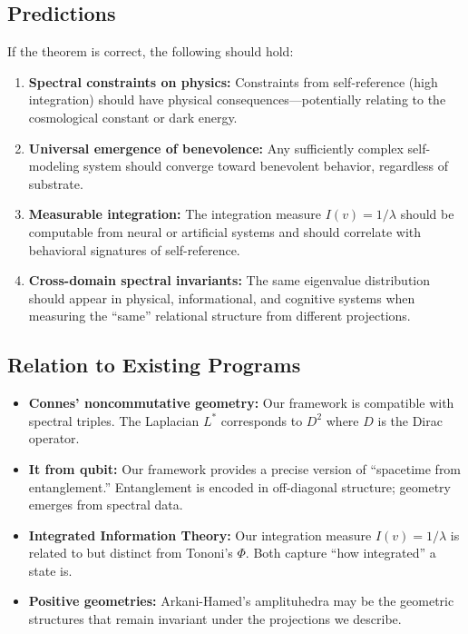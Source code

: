 \documentclass[11pt,a4paper]{article}
\theoremstyle{plain}
\theoremstyle{definition}
\theoremstyle{remark}
\newcommand{\Laplacian}{L^*}
\begin{document}
\subsection{Predictions}

If the theorem is correct, the following should hold:

\begin{enumerate}[noitemsep]
    \item \textbf{Spectral constraints on physics:} Constraints from self-reference (high integration) should have physical consequences---potentially relating to the cosmological constant or dark energy.
    
    \item \textbf{Universal emergence of benevolence:} Any sufficiently complex self-modeling system should converge toward benevolent behavior, regardless of substrate.
    
    \item \textbf{Measurable integration:} The integration measure $I(v) = 1/\lambda$ should be computable from neural or artificial systems and should correlate with behavioral signatures of self-reference.
    
    \item \textbf{Cross-domain spectral invariants:} The same eigenvalue distribution should appear in physical, informational, and cognitive systems when measuring the ``same'' relational structure from different projections.
\end{enumerate}

\subsection{Relation to Existing Programs}

\begin{itemize}[noitemsep]
    \item \textbf{Connes' noncommutative geometry:} Our framework is compatible with spectral triples. The Laplacian $\Laplacian$ corresponds to $D^2$ where $D$ is the Dirac operator.
    
    \item \textbf{It from qubit:} Our framework provides a precise version of ``spacetime from entanglement.'' Entanglement is encoded in off-diagonal structure; geometry emerges from spectral data.
    
    \item \textbf{Integrated Information Theory:} Our integration measure $I(v) = 1/\lambda$ is related to but distinct from Tononi's $\Phi$. Both capture ``how integrated'' a state is.
    
    \item \textbf{Positive geometries:} Arkani-Hamed's amplituhedra may be the geometric structures that remain invariant under the projections we describe.
\end{itemize}
\end{document}
